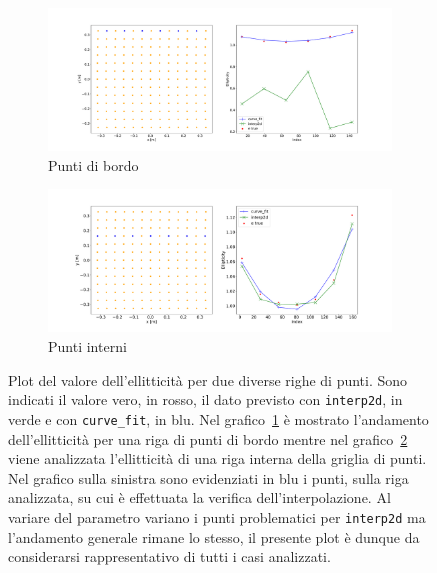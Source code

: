 \documentclass[12pt,a4paper,final]{book}
\begin{document}
\begin{figure}[!ht]
\centering
	\begin{subfigure}{\textwidth}
	    \centering
	    \includegraphics[width=\linewidth]{../figures/row_bordo.pdf}
	    \caption{Punti di bordo}
	    \label{plot_row_bordo}
	\end{subfigure}
\newline
	\begin{subfigure}{\textwidth}
		\centering
	    \includegraphics[width=\linewidth]{../figures/row_interno.pdf}
		\caption{Punti interni}
		\label{plot_row_interno}
	\end{subfigure}
	\caption{Plot del valore dell'ellitticità per due diverse righe di punti. Sono indicati il valore vero, in rosso, il dato previsto con \texttt{interp2d}, in verde e con \texttt{curve\_fit}, in blu. Nel grafico~\ref{plot_row_bordo} è mostrato l'andamento dell'ellitticità per una riga di punti di bordo mentre nel grafico~\ref{plot_row_interno} viene analizzata l'ellitticità di una riga interna della griglia di punti. Nel grafico sulla sinistra sono evidenziati in blu i punti, sulla riga analizzata, su cui è effettuata la verifica dell'interpolazione. Al variare del parametro variano i punti problematici per \texttt{interp2d} ma l'andamento generale rimane lo stesso, il presente plot è dunque da considerarsi rappresentativo di tutti i casi analizzati.}
	\label{plot_row}
\end{figure}
\end{document}
